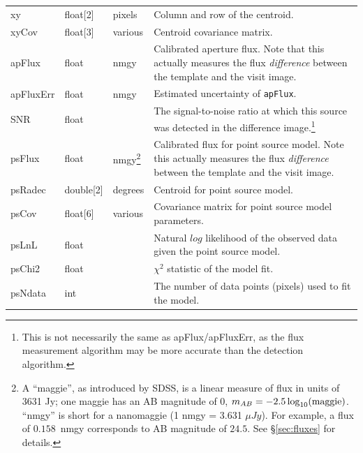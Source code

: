 \documentclass[12pt]{article}
\begin{document}
\begin{center}
\begin{longtable}{p{3cm}p{2cm}p{2cm}p{5cm}}
xy & float[2] & pixels & Column and row of the centroid. \\

xyCov & float[3] & various & Centroid covariance matrix. \\

apFlux & float & nmgy & Calibrated aperture flux. Note that this actually measures
the flux {\em difference} between the template and the visit image. \\

apFluxErr & float & nmgy &  Estimated uncertainty of \texttt{apFlux}. \\

SNR & float & ~ & The signal-to-noise ratio at which this source was detected in the difference image.\footnote{This is not necessarily the same as apFlux/apFluxErr, as the flux measurement algorithm may be more accurate than the detection algorithm.} \\

psFlux & float & nmgy\footnote{A ``maggie'', as introduced by SDSS, is a linear measure of flux in units of 3631 Jy; one maggie has an AB magnitude of 0, $m_{AB}=-2.5\log_{10}({\rm maggie})$. ``nmgy'' is short for a nanomaggie (1 nmgy = 3.631 $\mu Jy$). For example, a flux of $0.158$~nmgy corresponds to AB magnitude of $24.5$. See \S \ref{sec:fluxes} for details.} & Calibrated flux for point source model. Note this actually measures the flux {\em difference} between the template and the visit image. \\

psRadec & double[2] & degrees & Centroid for point source model. \\

psCov & float[6] & various & Covariance matrix for point source model parameters. \\

psLnL & float & ~ & Natural $log$ likelihood of the observed data given the point source model. \\

psChi2 & float & ~ & $\chi^2$ statistic of the model fit. \\

psNdata & int & ~ & The number of data points (pixels) used to fit the model. \\


\end{longtable}
\end{center}
\end{document}
